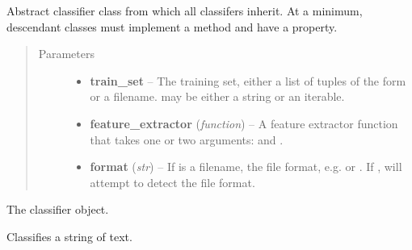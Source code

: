 \documentclass[letterpaper,10pt,english]{sphinxmanual}
\begin{document}
\begin{fulllineitems}
\label{api_reference:textblob.classifiers.BaseClassifier}
Abstract classifier class from which all classifers inherit. At a
minimum, descendant classes must implement a  method and have
a  property.
\begin{quote}\begin{description}
\item[{Parameters}] \leavevmode\begin{itemize}
\item {} 
\textbf{train\_set} -- The training set, either a list of tuples of the form
 or a filename.  may be either
a string or an iterable.

\item {} 
\textbf{feature\_extractor} (\emph{function}) -- A feature extractor function that takes one or
two arguments:  and .

\item {} 
\textbf{format} (\emph{str}) -- If  is a filename, the file format, e.g.
 or . If , will attempt to detect the
file format.

\end{itemize}

\end{description}\end{quote}


\begin{fulllineitems}
\label{api_reference:textblob.classifiers.BaseClassifier.classifier}
The classifier object.

\end{fulllineitems}


\begin{fulllineitems}
\label{api_reference:textblob.classifiers.BaseClassifier.classify}
Classifies a string of text.


\end{fulllineitems}
\end{fulllineitems}
\end{document}
